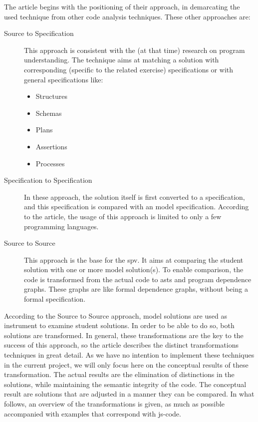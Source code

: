 The article begins with the positioning of their approach, in 
demarcating the used technique from other code analysis techniques. These other
approaches are:
\begin{description}
	\item[Source to Specification] This approach is consistent with the (at that
	time) research on program understanding. The technique aims at matching a
	\gls{solution} with corresponding (specific to the related exercise) 
	specifications or with general specifications like:
	\begin{itemize}
		\item Structures
		\item Schemas
		\item Plans
		\item Assertions
		\item Processes
	\end{itemize} 
	\item[Specification to Specification] In these approach, the \gls{solution} 
	itself is first converted to a specification, and this specification is 
	compared with an model specification. According to the article, the usage
	of this approach is limited to only a few programming languages.
	\item[Source to Source] This approach is the base for the \gls{spv}. It aims
	at comparing the student \gls{solution} with one or more model \gls{solution}(s).
	To enable comparison, the \gls{code} is transformed from the actual code to
	\glspl{ast} and program dependence graphs. These graphs are like formal 
	dependence graphs, without being a formal specification.
\end{description}
According to the Source to Source approach, model solutions are used as 
instrument to examine student solutions. In order to be able to do so, both 
solutions are transformed. In general, these transformations are the key to
the success of this approach, so the article describes the distinct 
transformations techniques in great detail. As we have no intention to implement
these techniques in the current project, we will only focus here on the 
conceptual results of these transformation. The actual results are the 
elimination of distinctions in the solutions, while maintaining the semantic
integrity of the code. The conceptual result are solutions that are adjusted in 
a manner they can be compared. In what follows, an overview of the
transformations is given, as much as possible accompanied with examples that 
correspond with \gls{js-code}. 

